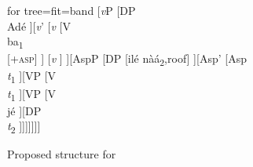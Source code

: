 \documentclass[output=paper,newtxmath,modfonts,nonflat,draftmode]{langsci/langscibook}
\begin{document}
\ea  
     \label{ex:parrish:split}   
     \label{ex:parrish:no-split}
 \z 
\z


\begin{figure}
	\caption{Proposed structure for  \label{fig:parrish:split-structure} }
	\begin{forest}for tree={fit=band}
        [\textit{v}P [DP\\{Adé} ][\textit{v}' [\textit{v} [V\\{ba\textsubscript{1}}\\{[+\textsc{asp}]} ] [\textit{v} ] ][AspP [DP [ilé nàá\textsubscript{2},roof] ][Asp' [Asp\\{\textit{t}\textsubscript{1}} ][VP [V\\\textit{t}\textsubscript{1} ][VP [V\\jé ][DP\\\textit{t}\textsubscript{2} ]]]]]]]
	\end{forest}
\end{figure}
\end{document}
